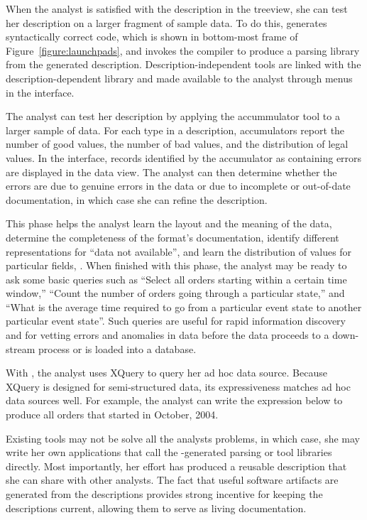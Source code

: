 When the analyst is satisfied with the description in the treeview,
she can test her description on a larger fragment of sample data.  To
do this, \launchpads{} generates syntactically correct \pads{} code,
which is shown in bottom-most frame of Figure~\ref{figure:launchpads},
and invokes the \pads{} compiler to produce a parsing library from the
generated description.  Description-independent tools are linked with
the description-dependent library and made available to the analyst
through menus in the \launchpads{} interface.  

The analyst can test her description by applying the accummulator tool
to a larger sample of data.  For each type in a \pads{} description,
accumulators report the number of good values, the number of bad
values, and the distribution of legal values.  In the \launchpads{}
interface, records identified by the accumulator as containing errors
are displayed in the data view.  The analyst can then determine
whether the errors are due to genuine errors in the data or due to
incomplete or out-of-date documentation, in which case she can refine
the description.

This phase helps the analyst learn the layout and the meaning of the
data, determine the completeness of the format's documentation,
identify different representations for ``data not available'', and
learn the distribution of values for particular fields, \etc{}.  When
finished with this phase, the analyst may be ready to ask some basic
queries such as ``Select all orders starting within a certain time
window,'' ``Count the number of orders going through a particular
state,'' and ``What is the average time required to go from a
particular event state to another particular event state''.  Such
queries are useful for rapid information discovery and for vetting
errors and anomalies in data before the data proceeds to a
down-stream process or is loaded into a database.

With \pads{}, the analyst uses XQuery to query her ad hoc data source.
Because XQuery is designed for semi-structured data, its
expressiveness matches ad hoc data sources well.  For example, the
analyst can write the expression below to produce all orders
that started in October, 2004.

Existing \pads{} tools may not be solve all the analysts problems,
in which case, she may write her own \pads{} applications that call
the \pads{}-generated parsing or tool libraries directly.  Most
importantly, her effort has produced a reusable description that she
can share with other analysts.  The fact that useful software
artifacts are generated from the descriptions provides strong
incentive for keeping the descriptions current, allowing them to serve
as living documentation.


